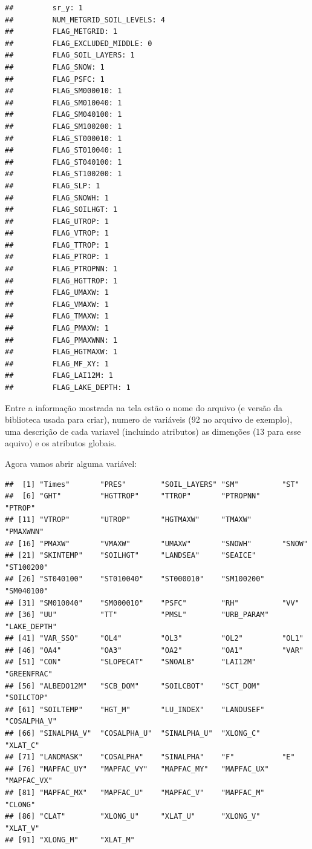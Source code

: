 \documentclass[]{book}
\newenvironment{Shaded}{\begin{snugshade}}{\end{snugshade}}
\newcommand{\KeywordTok}[1]{\textcolor[rgb]{0.13,0.29,0.53}{\textbf{#1}}}
\newcommand{\CommentTok}[1]{\textcolor[rgb]{0.56,0.35,0.01}{\textit{#1}}}
\newcommand{\OperatorTok}[1]{\textcolor[rgb]{0.81,0.36,0.00}{\textbf{#1}}}
\newcommand{\NormalTok}[1]{#1}
\theoremstyle{definition}
\theoremstyle{definition}
\theoremstyle{definition}
\theoremstyle{remark}
\begin{document}
\begin{verbatim}
##         sr_y: 1
##         NUM_METGRID_SOIL_LEVELS: 4
##         FLAG_METGRID: 1
##         FLAG_EXCLUDED_MIDDLE: 0
##         FLAG_SOIL_LAYERS: 1
##         FLAG_SNOW: 1
##         FLAG_PSFC: 1
##         FLAG_SM000010: 1
##         FLAG_SM010040: 1
##         FLAG_SM040100: 1
##         FLAG_SM100200: 1
##         FLAG_ST000010: 1
##         FLAG_ST010040: 1
##         FLAG_ST040100: 1
##         FLAG_ST100200: 1
##         FLAG_SLP: 1
##         FLAG_SNOWH: 1
##         FLAG_SOILHGT: 1
##         FLAG_UTROP: 1
##         FLAG_VTROP: 1
##         FLAG_TTROP: 1
##         FLAG_PTROP: 1
##         FLAG_PTROPNN: 1
##         FLAG_HGTTROP: 1
##         FLAG_UMAXW: 1
##         FLAG_VMAXW: 1
##         FLAG_TMAXW: 1
##         FLAG_PMAXW: 1
##         FLAG_PMAXWNN: 1
##         FLAG_HGTMAXW: 1
##         FLAG_MF_XY: 1
##         FLAG_LAI12M: 1
##         FLAG_LAKE_DEPTH: 1
\end{verbatim}

Entre a informação mostrada na tela estão o nome do arquivo (e versão da
biblioteca usada para criar), numero de variáveis (92 no arquivo de
exemplo), uma descrição de cada variavel (incluindo atributos) as
dimenções (13 para esse aquivo) e os atributos globais.

Agora vamos abrir alguma variável:

\begin{Shaded}
\end{Shaded}

\begin{verbatim}
##  [1] "Times"       "PRES"        "SOIL_LAYERS" "SM"          "ST"         
##  [6] "GHT"         "HGTTROP"     "TTROP"       "PTROPNN"     "PTROP"      
## [11] "VTROP"       "UTROP"       "HGTMAXW"     "TMAXW"       "PMAXWNN"    
## [16] "PMAXW"       "VMAXW"       "UMAXW"       "SNOWH"       "SNOW"       
## [21] "SKINTEMP"    "SOILHGT"     "LANDSEA"     "SEAICE"      "ST100200"   
## [26] "ST040100"    "ST010040"    "ST000010"    "SM100200"    "SM040100"   
## [31] "SM010040"    "SM000010"    "PSFC"        "RH"          "VV"         
## [36] "UU"          "TT"          "PMSL"        "URB_PARAM"   "LAKE_DEPTH" 
## [41] "VAR_SSO"     "OL4"         "OL3"         "OL2"         "OL1"        
## [46] "OA4"         "OA3"         "OA2"         "OA1"         "VAR"        
## [51] "CON"         "SLOPECAT"    "SNOALB"      "LAI12M"      "GREENFRAC"  
## [56] "ALBEDO12M"   "SCB_DOM"     "SOILCBOT"    "SCT_DOM"     "SOILCTOP"   
## [61] "SOILTEMP"    "HGT_M"       "LU_INDEX"    "LANDUSEF"    "COSALPHA_V" 
## [66] "SINALPHA_V"  "COSALPHA_U"  "SINALPHA_U"  "XLONG_C"     "XLAT_C"     
## [71] "LANDMASK"    "COSALPHA"    "SINALPHA"    "F"           "E"          
## [76] "MAPFAC_UY"   "MAPFAC_VY"   "MAPFAC_MY"   "MAPFAC_UX"   "MAPFAC_VX"  
## [81] "MAPFAC_MX"   "MAPFAC_U"    "MAPFAC_V"    "MAPFAC_M"    "CLONG"      
## [86] "CLAT"        "XLONG_U"     "XLAT_U"      "XLONG_V"     "XLAT_V"     
## [91] "XLONG_M"     "XLAT_M"
\end{verbatim}
\end{document}
